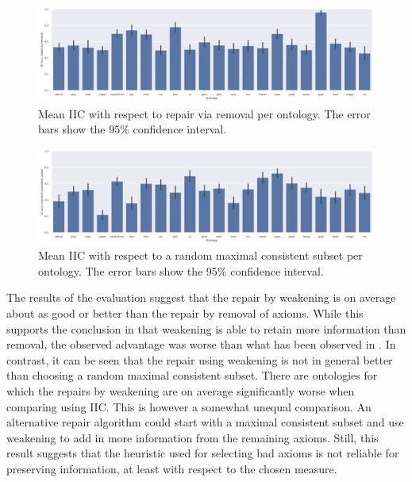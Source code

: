 \documentclass[
]{ceurart}
\begin{document}
\begin{figure}
  \centering
  \includegraphics[width=\textwidth]{figures/iic-remove-ontology-bar.png}
  \caption{Mean IIC with respect to repair via removal per ontology. The error bars show the 95\% confidence interval.}
  \label{fig:results-remove}
\end{figure}

\begin{figure}
  \centering
  \includegraphics[width=\textwidth]{figures/iic-mcs-ontology-bar.png}
  \caption{Mean IIC with respect to a random maximal consistent subset per ontology. The error bars show the 95\% confidence interval.}
  \label{fig:results-mcs}
\end{figure}

The results of the evaluation suggest that the repair by weakening is on average about as good or better than the repair by removal of axioms. While this supports the conclusion in \cite{troquard2018repairing} that weakening is able to retain more information than removal, the observed advantage was worse than what has been observed in \cite{troquard2018repairing}. In contrast, it can be seen that the repair using weakening is not in general better than choosing a random maximal consistent subset. There are ontologies for which the repairs by weakening are on average significantly worse when comparing using IIC. This is however a somewhat unequal comparison. An alternative repair algorithm could start with a maximal consistent subset and use weakening to add in more information from the remaining axioms. Still, this result suggests that the heuristic used for selecting bad axioms is not reliable for preserving information, at least with respect to the chosen measure.
\end{document}
